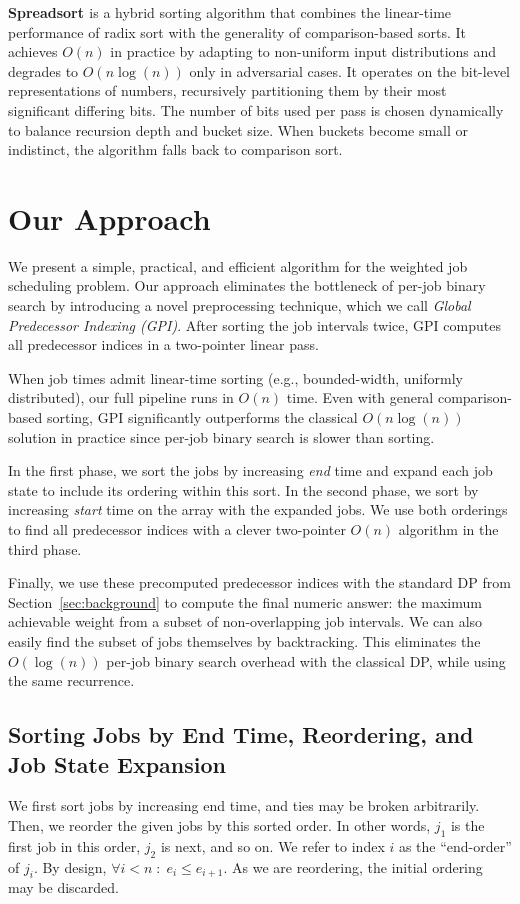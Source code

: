\documentclass[final,5p,times]{elsarticle}
\begin{document}
\textbf{Spreadsort \cite{spreadsort2002}} is a hybrid sorting algorithm that combines the linear-time performance of radix sort with the generality of comparison-based sorts. It achieves $O(n)$ in practice by adapting to non-uniform input distributions and degrades to $O(n \log(n))$ only in adversarial cases. It operates on the bit-level representations of numbers, recursively partitioning them by their most significant differing bits. The number of bits used per pass is chosen dynamically to balance recursion depth and bucket size. When buckets become small or indistinct, the algorithm falls back to comparison sort.

\section{Our Approach}
\label{sec:approach}
We present a simple, practical, and efficient algorithm for the weighted job scheduling problem. Our approach eliminates the bottleneck of per-job binary search by introducing a novel preprocessing technique, which we call \textit{Global Predecessor Indexing (GPI)}. After sorting the job intervals twice, GPI computes all predecessor indices in a two-pointer linear pass.

When job times admit linear-time sorting (e.g., bounded-width, uniformly distributed), our full pipeline runs in $O(n)$ time. Even with general comparison-based sorting, GPI significantly outperforms the classical $O(n \log(n))$ solution in practice since per-job binary search is slower than sorting.

In the first phase, we sort the jobs by increasing \textit{end} time and expand each job state to include its ordering within this sort. In the second phase, we sort by increasing \textit{start} time on the array with the expanded jobs. We use both orderings to find all predecessor indices with a clever two-pointer $O(n)$ algorithm in the third phase.

Finally, we use these precomputed predecessor indices with the standard DP from Section~\ref{sec:background} to compute the final numeric answer: the maximum achievable weight from a subset of non-overlapping job intervals. We can also easily find the subset of jobs themselves by backtracking. This eliminates the $O(\log(n))$ per-job binary search overhead with the classical DP, while using the same recurrence. 

\subsection{Sorting Jobs by End Time, Reordering, and Job State Expansion}
\label{sec:endtimesort}
We first sort jobs by increasing end time, and ties may be broken arbitrarily. Then, we reorder the given jobs by this sorted order. In other words, $j_1$ is the first job in this order, $j_2$ is next, and so on. We refer to index $i$ as the \enquote{end-order} of $j_i$. By design, $\forall i < n \;:\; e_i \leq e_{i+1}$. As we are reordering, the initial ordering may be discarded.
\end{document}
